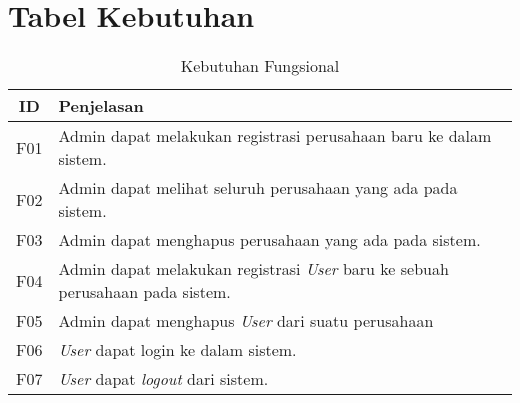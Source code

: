 \chapter{Tabel Kebutuhan}

\bgroup
\begin{table}[ht]
  \def\arraystretch{1.5}
  \caption{Kebutuhan Fungsional}
  \label{tab:kebutuhan-fungsional}
  \centering
  \begin{tabular}{|c|p{12cm}|}
    \hline
    ID  & Penjelasan                                                                                                      \\
    \hline
    F01 & Admin dapat melakukan registrasi perusahaan baru ke dalam sistem.                                               \\
    \hline
    F02 & Admin dapat melihat seluruh perusahaan yang ada pada sistem.                                                    \\
    \hline
    F03 & Admin dapat menghapus perusahaan yang ada pada sistem.                                                          \\
    \hline
    F04 & Admin dapat melakukan registrasi \textit{User} baru ke sebuah perusahaan pada sistem.
    \\
    \hline
    F05 & Admin dapat menghapus \textit{User} dari suatu perusahaan
    \\
    \hline
    F06 & \textit{User} dapat login ke dalam sistem.
    \\
    \hline
    F07 & \textit{User} dapat \textit{logout} dari sistem.


\end{tabular}
\end{table}

